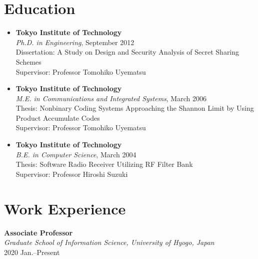 \section*{Education}

\begin{itemize}
  \item \textbf{Tokyo Institute of Technology}\\
	\hspace*{4ex}\textit{Ph.D. in Engineering}, September 2012\\
	\hspace*{4ex}Dissertation: A Study on Design and Security Analysis of Secret Sharing Schemes\\
	\hspace*{4ex}Supervisor: Professor Tomohiko Uyematsu

  \item \textbf{Tokyo Institute of Technology}\\
	\hspace*{4ex}\textit{M.E. in Communications and Integrated
	Systems}, March 2006\\
	\hspace*{4ex}Thesis: Nonbinary Coding Systems Approaching the Shannon Limit by Using Product Accumulate Codes\\
	\hspace*{4ex}Supervisor: Professor Tomohiko Uyematsu

  \item \textbf{Tokyo Institute of Technology}\\
	\hspace*{4ex}\textit{B.E. in Computer Science}, March 2004\\
	\hspace*{4ex}Thesis: Software Radio Receiver Utilizing RF Filter Bank\\
	\hspace*{4ex}Supervisor: Professor Hiroshi Suzuki
\end{itemize}


\section*{Work Experience}
\textbf{Associate Professor}\\
\hspace*{4ex}\textit{Graduate School of Information Science, University of Hyogo, Japan}\\
\hspace*{4ex}2020 Jan.--Present

